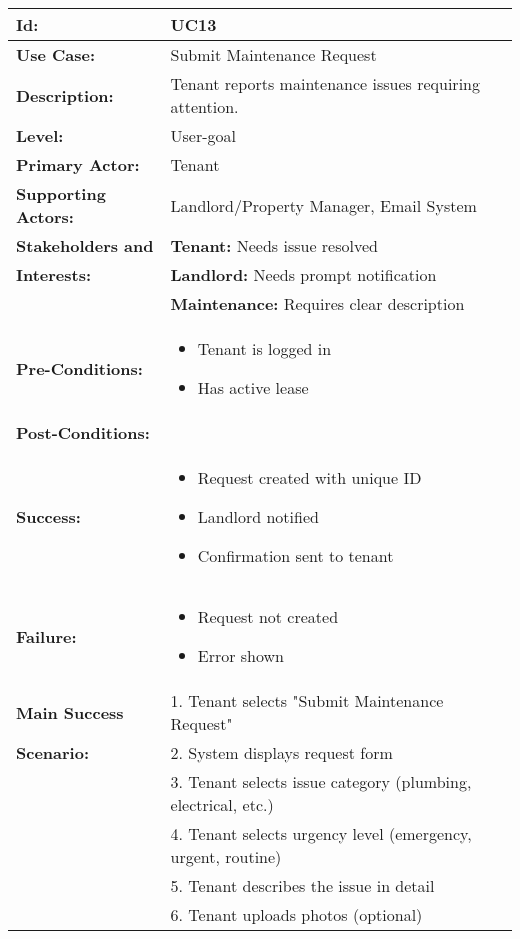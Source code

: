\documentclass[12pt]{article}
\begin{document}
\begin{longtable}{|p{3cm}|p{11cm}|}
\hline
\textbf{Id:} & UC13 \\
\hline
\textbf{Use Case:} & Submit Maintenance Request \\
\hline
\textbf{Description:} & Tenant reports maintenance issues requiring attention. \\
\hline
\textbf{Level:} & User-goal \\
\hline
\textbf{Primary Actor:} & Tenant \\
\hline
\textbf{Supporting Actors:} & Landlord/Property Manager, Email System \\
\hline
\textbf{Stakeholders and} & \textbf{Tenant:} Needs issue resolved \\
\textbf{Interests:} & \textbf{Landlord:} Needs prompt notification \\
& \textbf{Maintenance:} Requires clear description \\
\hline
\textbf{Pre-Conditions:} & 
\begin{itemize}
    \item Tenant is logged in
    \item Has active lease
\end{itemize} \\
\hline
\textbf{Post-Conditions:} & \\
\textbf{Success:} & 
\begin{itemize}
    \item Request created with unique ID
    \item Landlord notified
    \item Confirmation sent to tenant
\end{itemize} \\
\textbf{Failure:} & 
\begin{itemize}
    \item Request not created
    \item Error shown
\end{itemize} \\
\hline
\textbf{Main Success} & 1. Tenant selects "Submit Maintenance Request" \\
\textbf{Scenario:} & 2. System displays request form \\
& 3. Tenant selects issue category (plumbing, electrical, etc.) \\
& 4. Tenant selects urgency level (emergency, urgent, routine) \\
& 5. Tenant describes the issue in detail \\
& 6. Tenant uploads photos (optional) \\

\end{longtable}
\end{document}

